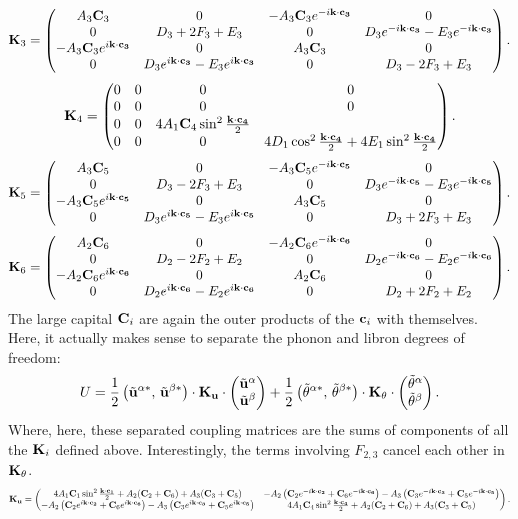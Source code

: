 \documentclass[12pt]{article}
\begin{document}
\[ \mathbf{K}_3 = \left(\begin{matrix}
 A_3\mathbf{C}_3 & 0 & -A_3 \mathbf{C}_3 e^{-i\mathbf{k}\cdot\mathbf{c_3}} & 0 \\
0 & D_3 + 2F_3 + E_3 & 0 & D_3e^{-i\mathbf{k}\cdot\mathbf{c_3}} - 
E_3e^{-i\mathbf{k}\cdot\mathbf{c_3}} \\
-A_3 \mathbf{C}_3 e^{i\mathbf{k}\cdot\mathbf{c_3}} & 0 & A_3 \mathbf{C}_3 & 0  \\
0 &  D_3 e^{i\mathbf{k}\cdot\mathbf{c_3}} - E_3 e^{i\mathbf{k}\cdot\mathbf{c_3}} & 0  & D_3 - 2F_3 + 
E_3\end{matrix}\right).\]
\[ \mathbf{K}_4 = \left(\begin{matrix} 0 & 0 & 0 & 0 \\ 0 & 0 & 0 & 0 \\ 0 & 0 & 4A_1 \mathbf{C}_4
\sin^2 \frac{\mathbf{k}\cdot\mathbf{c_4}}{2}\\ 0 & 0 & 0 & 4D_1 \cos^2\frac{\mathbf{k}\cdot\mathbf{c_4}}{2} + 4E_1 
\sin^2 \frac{\mathbf{k}\cdot\mathbf{c_4}}{2} \end{matrix}\right).\]
\[ \mathbf{K}_5 = \left(\begin{matrix} A_3\mathbf{C}_5 & 0 & -A_3 \mathbf{C}_5 e^{-i\mathbf{k}\cdot\mathbf{c_5}} & 0 \\
0 & D_3 - 2F_3 + E_3 & 0 & D_3e^{-i\mathbf{k}\cdot\mathbf{c_5}} - 
E_3e^{-i\mathbf{k}\cdot\mathbf{c_5}} \\
-A_3 \mathbf{C}_5 e^{i\mathbf{k}\cdot\mathbf{c_5}} & 0 & A_3 \mathbf{C}_5 & 0  \\
0 &  D_3 e^{i\mathbf{k}\cdot\mathbf{c_5}} - E_3 e^{i\mathbf{k}\cdot\mathbf{c_5}} & 0  & D_3 + 2F_3 + 
E_3\end{matrix}\right).\]
\[ \mathbf{K}_6 = \left(\begin{matrix} A_2\mathbf{C}_6 & 0 & -A_2 \mathbf{C}_6 e^{-i\mathbf{k}\cdot\mathbf{c_6}} & 0 \\
0 & D_2 - 2F_2 + E_2 & 0 & D_2e^{-i\mathbf{k}\cdot\mathbf{c_6}} - 
E_2e^{-i\mathbf{k}\cdot\mathbf{c_6}} \\
-A_2 \mathbf{C}_6 e^{i\mathbf{k}\cdot\mathbf{c_6}} & 0 & A_2 \mathbf{C}_6 & 0  \\
0 &  D_2 e^{i\mathbf{k}\cdot\mathbf{c_6}} - E_2 e^{i\mathbf{k}\cdot\mathbf{c_6}} & 0  & D_2 + 2F_2 + 
E_2\end{matrix}\right).\]
The large capital $\mathbf{C}_i$ are again the outer products of the $\mathbf{c}_i$ 
with themselves. Here, it actually makes sense to separate the phonon and 
libron degrees of freedom:
\[ U = \frac{1}{2} \left(\tilde {\mathbf{u}}^{\alpha *}, \, \tilde {\mathbf{u}}^{\beta *}\right)\cdot 
\mathbf{K}_{\mathbf{u}} \cdot \left(\begin{matrix}\tilde {\mathbf{u}}^{\alpha}  \\ \tilde {\mathbf{u}}^{\beta}\end{matrix}\right) + 
\frac{1}{2} \left(\tilde {\theta}^{\alpha *} , \, \tilde {\theta}^{\beta *} \right) \cdot \mathbf{K}_{\theta} 
\cdot \left(\begin{matrix} \tilde {\theta}^\alpha \\ \tilde {\theta}^\beta \end{matrix}\right).\]
Where, here, these separated coupling matrices are the sums of components of 
all the $\mathbf{K}_i$ defined above. Interestingly, the terms involving $F_{2,3}$ 
cancel each other in $\mathbf{K}_\theta$.
\newcommand*{\Scale}[2][4]{\scalebox{#1}{$#2$}}
\[ \Scale[0.8]{\bv K_{\bv u} = \pmtrx{ 4A_1\bv C_1 \sin^2 \half{\Dot{k}{c_1}} 
+ A_2(\bv C_2 + \bv C_6) + A_3 (\bv C_3 + \bv C_5) & -A_2\paren{ \bv C_2 
e^{-i\Dot{k}{c_2}} + \bv C_6 e^{-i\Dot{k}{c_6} }} - A_3\paren{ \bv C_3 
e^{-i\Dot{k}{c_3}} + \bv C_5 e^{-i\Dot{k}{c_5} }} \\ -A_2\paren{ \bv C_2 
e^{i\Dot{k}{c_2}} + \bv C_6 e^{i\Dot{k}{c_6} }} - A_3\paren{ \bv C_3 
e^{i\Dot{k}{c_3}} + \bv C_5 e^{i\Dot{k}{c_5} }} & 4A_1\bv C_4 \sin^2 
\half{\Dot{k}{c_4}} + 
A_2(\bv C_2 + \bv C_6) + A_3 (\bv C_3 + \bv C_5)}.}\]
\end{document}
